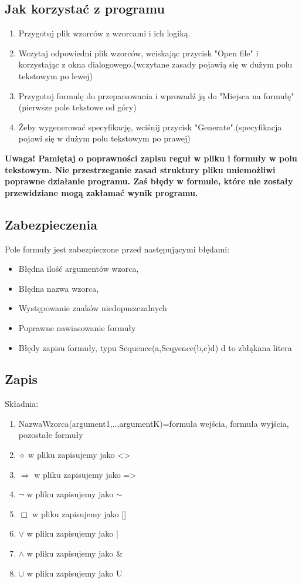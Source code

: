 \documentclass[a4paper, 11pt]{article}
\begin{document}
	\subsection{Jak korzystać z programu}
	\begin{enumerate}
	\item Przygotuj plik wzorców z wzorcami i ich logiką.
	\item Wczytaj odpowiedni plik wzorców, wciskając przycisk "Open file" i korzystając z okna dialogowego.(wczytane zasady pojawią się w dużym polu tekstowym po lewej)
	\item Przygotuj formulę do przeparsowania i wprowadź ją do "Miejsca na formułę"(pierwsze pole tekstowe od góry)
	\item Żeby wygenerować specyfikację, wciśnij przycisk "Generate".(specyfikacja pojawi się w dużym polu tekstowym po prawej)
	\end{enumerate}
	
	\textbf{ Uwaga! Pamiętaj o poprawności zapisu reguł w pliku i formuły w polu tekstowym. Nie przestrzeganie zasad struktury pliku uniemożliwi poprawne działanie programu. Zaś błędy w formule, które nie zostały przewidziane mogą zakłamać wynik programu.}
	
	
	
	\subsection{Zabezpieczenia}
	Pole formuły jest zabezpieczone przed następującymi błędami:
	\begin{itemize}
	\item Błędna ilość argumentów wzorca,
	\item Błędna nazwa wzorca,
	\item Występowanie znaków niedopuszczalnych
	\item Poprawne nawiasowanie formuły
	\item Błędy zapisu formuły, typu Sequence(a,Seqyence(b,c)d) d to zbłąkana litera
	\end{itemize}
	\subsection{Zapis}
	Składnia:
		\begin{enumerate}
		\item NazwaWzorca(argument1,..,argumentK)={formuła wejścia, formuła wyjścia, pozostałe formuły}
		\item $ \diamond $ w pliku zapisujemy jako <>
		\item $\Rightarrow $ w pliku zapisujemy jako =>
		\item $\neg$ w pliku zapisujemy jako $\sim $
		\item $ \Box $ w pliku zapisujemy jako []
		\item $\vee $ w pliku zapisujemy jako |
		\item $ \wedge $ w pliku zapisujemy jako \&
		\item $\cup$ w pliku zapisujemy jako U
		
		\end{enumerate}
	
\end{document}
